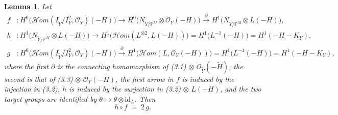 \documentclass[11pt,twoside]{amsart}
\theoremstyle{plain}
\numberwithin{equation}{section}
\newtheorem{lemma}[theorem]{Lemma}
\theoremstyle{definition}
\begin{document}
\begin{lemma}\label{lem:hfg}
Let
\begin{align*}
f&\colon H^0\big(\mathcal{H}om(I_{\widetilde Y}/I_Y^2,\mathcal{O}_Y)(-H)\big)
   \longrightarrow H^0\big(N_{\widetilde Y/\mathbb{P}^M}\otimes\mathcal{O}_Y(-H)\big)
   \xrightarrow{\ \partial\ } H^1\big(N_{\widetilde Y/\mathbb{P}^M}\otimes L(-H)\big),\\
h&\colon H^1\big(N_{\widetilde Y/\mathbb{P}^M}\otimes L(-H)\big)
   \longrightarrow H^1\big(\mathcal{H}om(L^{\otimes 2},L(-H))\big)=H^1\big(L^{-1}(-H)\big)=H^1(-H-K_Y),\\
g&\colon H^0\big(\mathcal{H}om(I_{\widetilde Y}/I_Y^2,\mathcal{O}_Y)(-H)\big)
   \xrightarrow{\ \partial\ } H^1\big(\mathcal{H}om(L,\mathcal{O}_Y(-H))\big)=H^1\big(L^{-1}(-H)\big)=H^1(-H-K_Y),
\end{align*}
where the first $\partial$ is the connecting homomorphism of
(3.1)$\,\otimes\,\mathcal{O}_{\widetilde Y}(-\widetilde H)$, the second is that of
(3.3)$\,\otimes\,\mathcal{O}_Y(-H)$, the first arrow in $f$ is induced by the injection in (3.2),
$h$ is induced by the surjection in (3.2)$\,\otimes\,L(-H)$, and the two target groups are
identified by $\theta\mapsto\theta\otimes\mathrm{id}_L$. Then
\[
h\circ f \;=\; 2\,g .
\]
\end{lemma}
\end{document}
